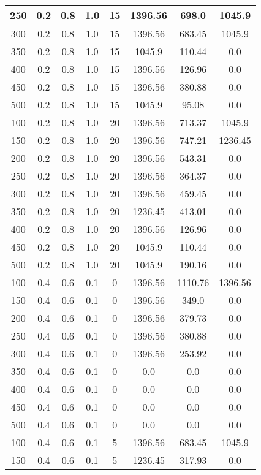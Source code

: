 \documentclass[a4paper, 12pt]{extreport}
\begin{document}
\begin{itemize}
\begin{longtable}{|c|c|c|c|c|c|c|c|}
			250 & 0.2 & 0.8 & 1.0 & 15 & 1396.56 & 698.0 & 1045.9 \\\hline
			300 & 0.2 & 0.8 & 1.0 & 15 & 1396.56 & 683.45 & 1045.9 \\\hline
			350 & 0.2 & 0.8 & 1.0 & 15 & 1045.9 & 110.44 & 0.0 \\\hline
			400 & 0.2 & 0.8 & 1.0 & 15 & 1396.56 & 126.96 & 0.0 \\\hline
			450 & 0.2 & 0.8 & 1.0 & 15 & 1396.56 & 380.88 & 0.0 \\\hline
			500 & 0.2 & 0.8 & 1.0 & 15 & 1045.9 & 95.08 & 0.0 \\\hline
			100 & 0.2 & 0.8 & 1.0 & 20 & 1396.56 & 713.37 & 1045.9 \\\hline
			150 & 0.2 & 0.8 & 1.0 & 20 & 1396.56 & 747.21 & 1236.45 \\\hline
			200 & 0.2 & 0.8 & 1.0 & 20 & 1396.56 & 543.31 & 0.0 \\\hline
			250 & 0.2 & 0.8 & 1.0 & 20 & 1396.56 & 364.37 & 0.0 \\\hline
			300 & 0.2 & 0.8 & 1.0 & 20 & 1396.56 & 459.45 & 0.0 \\\hline
			350 & 0.2 & 0.8 & 1.0 & 20 & 1236.45 & 413.01 & 0.0 \\\hline
			400 & 0.2 & 0.8 & 1.0 & 20 & 1396.56 & 126.96 & 0.0 \\\hline
			450 & 0.2 & 0.8 & 1.0 & 20 & 1045.9 & 110.44 & 0.0 \\\hline
			500 & 0.2 & 0.8 & 1.0 & 20 & 1045.9 & 190.16 & 0.0 \\\hline
			100 & 0.4 & 0.6 & 0.1 & 0 & 1396.56 & 1110.76 & 1396.56 \\\hline
			150 & 0.4 & 0.6 & 0.1 & 0 & 1396.56 & 349.0 & 0.0 \\\hline
			200 & 0.4 & 0.6 & 0.1 & 0 & 1396.56 & 379.73 & 0.0 \\\hline
			250 & 0.4 & 0.6 & 0.1 & 0 & 1396.56 & 380.88 & 0.0 \\\hline
			300 & 0.4 & 0.6 & 0.1 & 0 & 1396.56 & 253.92 & 0.0 \\\hline
			350 & 0.4 & 0.6 & 0.1 & 0 & 0.0 & 0.0 & 0.0 \\\hline
			400 & 0.4 & 0.6 & 0.1 & 0 & 0.0 & 0.0 & 0.0 \\\hline
			450 & 0.4 & 0.6 & 0.1 & 0 & 0.0 & 0.0 & 0.0 \\\hline
			500 & 0.4 & 0.6 & 0.1 & 0 & 0.0 & 0.0 & 0.0 \\\hline
			100 & 0.4 & 0.6 & 0.1 & 5 & 1396.56 & 683.45 & 1045.9 \\\hline
			150 & 0.4 & 0.6 & 0.1 & 5 & 1236.45 & 317.93 & 0.0 \\\hline

\end{longtable}
\end{itemize}
\end{document}
